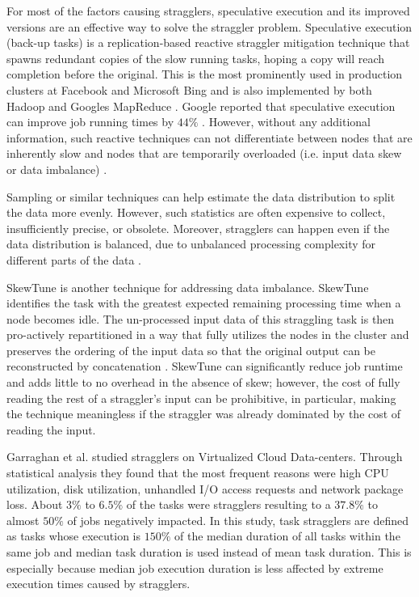 For most of the factors causing stragglers, speculative execution and its improved versions are an effective way to solve the straggler problem. 
Speculative execution (back-up tasks) is a replication-based reactive straggler mitigation technique that spawns redundant copies of the slow running tasks, hoping a copy will reach completion before the original. 
This is the most prominently used in production clusters at Facebook and Microsoft Bing and is also implemented by both Hadoop and Google\textsc{}s MapReduce \cite{Dean2004}.
Google reported that speculative execution can improve job running times by $44\%$ \cite{Dean2004}.
However, without any additional information, such reactive techniques can not differentiate between nodes that are inherently slow and nodes that are temporarily overloaded (i.e. input data skew or data imbalance) \cite{Chen2014, Bhandare2016}.

Sampling or similar techniques can help estimate the data distribution to split the data more evenly. 
However, such statistics are often expensive to collect, insufficiently precise, or obsolete. 
Moreover, stragglers can happen even if the data distribution is balanced, due to unbalanced processing complexity for different parts of the data \cite{Khoshlessan:2017ab}.

SkewTune is another technique for addressing data imbalance. 
SkewTune identifies the task with the greatest expected remaining processing time when a node becomes idle. 
The un-processed input data of this straggling task is then pro-actively repartitioned in a way that fully utilizes the nodes in the cluster and preserves 
the ordering of the input data so that the original output can be reconstructed by concatenation \cite{Kwon2012}. 
SkewTune can significantly reduce job runtime and adds little to no overhead in the absence of skew; however, the cost of fully reading the rest of a straggler's input can be prohibitive, in particular, making 
the technique meaningless if the straggler was already dominated by the cost of reading the input.

Garraghan et al. \cite{Garraghan2016} studied stragglers on Virtualized Cloud Data-centers. 
Through statistical analysis they found that the most frequent reasons were high CPU utilization, disk utilization, unhandled I/O access requests and network package loss. 
About $3\%$ to $6.5\%$ of the tasks were stragglers resulting to a $37.8\%$ to almost $50\%$ of jobs negatively impacted. 
In this study, task stragglers are defined as tasks whose execution is $150\%$ of the median duration of all tasks within the same job and median task duration is used instead of mean task duration. 
This is especially because median job execution duration is less affected by extreme execution times caused by stragglers.  


